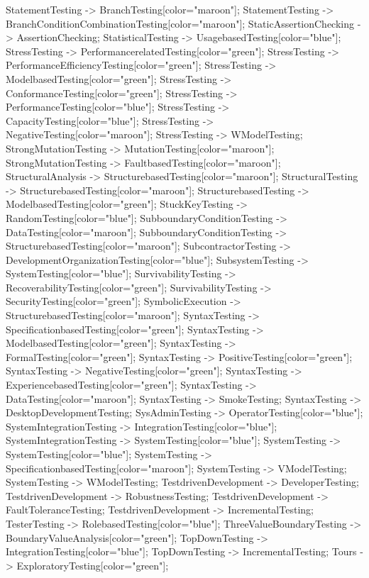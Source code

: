 \documentclass{article}
\begin{document}
{StatementTesting -> BranchTesting[color="maroon"];
StatementTesting -> BranchConditionCombinationTesting[color="maroon"];
StaticAssertionChecking -> AssertionChecking;
StatisticalTesting -> UsagebasedTesting[color="blue"];
StressTesting -> PerformancerelatedTesting[color="green"];
StressTesting -> PerformanceEfficiencyTesting[color="green"];
StressTesting -> ModelbasedTesting[color="green"];
StressTesting -> ConformanceTesting[color="green"];
StressTesting -> PerformanceTesting[color="blue"];
StressTesting -> CapacityTesting[color="blue"];
StressTesting -> NegativeTesting[color="maroon"];
StressTesting -> WModelTesting;
StrongMutationTesting -> MutationTesting[color="maroon"];
StrongMutationTesting -> FaultbasedTesting[color="maroon"];
StructuralAnalysis -> StructurebasedTesting[color="maroon"];
StructuralTesting -> StructurebasedTesting[color="maroon"];
StructurebasedTesting -> ModelbasedTesting[color="green"];
StuckKeyTesting -> RandomTesting[color="blue"];
SubboundaryConditionTesting -> DataTesting[color="maroon"];
SubboundaryConditionTesting -> StructurebasedTesting[color="maroon"];
SubcontractorTesting -> DevelopmentOrganizationTesting[color="blue"];
SubsystemTesting -> SystemTesting[color="blue"];
SurvivabilityTesting -> RecoverabilityTesting[color="green"];
SurvivabilityTesting -> SecurityTesting[color="green"];
SymbolicExecution -> StructurebasedTesting[color="maroon"];
SyntaxTesting -> SpecificationbasedTesting[color="green"];
SyntaxTesting -> ModelbasedTesting[color="green"];
SyntaxTesting -> FormalTesting[color="green"];
SyntaxTesting -> PositiveTesting[color="green"];
SyntaxTesting -> NegativeTesting[color="green"];
SyntaxTesting -> ExperiencebasedTesting[color="green"];
SyntaxTesting -> DataTesting[color="maroon"];
SyntaxTesting -> SmokeTesting;
SyntaxTesting -> DesktopDevelopmentTesting;
SysAdminTesting -> OperatorTesting[color="blue"];
SystemIntegrationTesting -> IntegrationTesting[color="blue"];
SystemIntegrationTesting -> SystemTesting[color="blue"];
SystemTesting -> SystemTesting[color="blue"];
SystemTesting -> SpecificationbasedTesting[color="maroon"];
SystemTesting -> VModelTesting;
SystemTesting -> WModelTesting;
TestdrivenDevelopment -> DeveloperTesting;
TestdrivenDevelopment -> RobustnessTesting;
TestdrivenDevelopment -> FaultToleranceTesting;
TestdrivenDevelopment -> IncrementalTesting;
TesterTesting -> RolebasedTesting[color="blue"];
ThreeValueBoundaryTesting -> BoundaryValueAnalysis[color="green"];
TopDownTesting -> IntegrationTesting[color="blue"];
TopDownTesting -> IncrementalTesting;
Tours -> ExploratoryTesting[color="green"];
}
\end{document}
